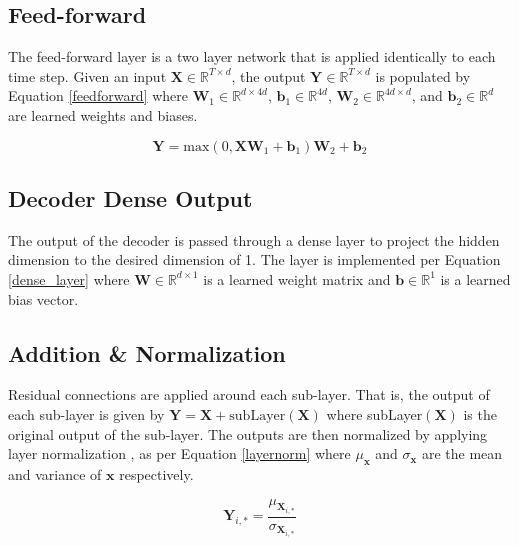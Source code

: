 \documentclass[conference]{IEEEtran}
\begin{document}
\subsection{Feed-forward}
The feed-forward layer is a two layer network that is applied identically to each time step.
Given an input $\boldsymbol{X} \in \mathbb{R}^{T \times d}$, the output $\boldsymbol{Y} \in \mathbb{R}^{T \times d}$ is populated by Equation \ref{feedforward} where $\boldsymbol{W}_1 \in \mathbb{R}^{d \times 4d}$, $\boldsymbol{b}_1 \in \mathbb{R}^{4d}$, $\boldsymbol{W}_2 \in \mathbb{R}^{4d \times d}$, and $\boldsymbol{b}_2 \in \mathbb{R}^{d}$ are learned weights and biases.

\begin{equation} \label{feedforward}
\boldsymbol{Y} = \text{max}(0, \boldsymbol{X}  \boldsymbol{W}_1 + \boldsymbol{b}_1)  \boldsymbol{W}_2 + \boldsymbol{b}_2
\end{equation}

\subsection{Decoder Dense Output}
The output of the decoder is passed through a dense layer to project the hidden dimension to the desired dimension of 1.
The layer is implemented per Equation \ref{dense_layer} where $\boldsymbol{W} \in \mathbb{R}^{d \times 1}$ is a learned weight matrix and $\boldsymbol{b} \in \mathbb{R}^{1}$ is a learned bias vector.



\subsection{Addition \& Normalization}
Residual connections \cite{He2015} are applied around each sub-layer.
That is, the output of each sub-layer is given by $\boldsymbol{Y} = \boldsymbol{X} + \text{subLayer}(\boldsymbol{X})$ where subLayer$(\boldsymbol{X})$ is the original output of the sub-layer.
The outputs are then normalized by applying layer normalization \cite{Ba2016}, as per Equation \ref{layernorm} where $\mu_{\boldsymbol{x}}$ and $\sigma_{\boldsymbol{x}}$ are the mean and variance of $\boldsymbol{x}$ respectively.

\begin{equation} \label{layernorm}
\boldsymbol{Y}_{i,*} = \frac{\mu_{\boldsymbol{X}_{i,*}}}{\sigma_{\boldsymbol{X}_{i,*}}}
\end{equation}
\end{document}
